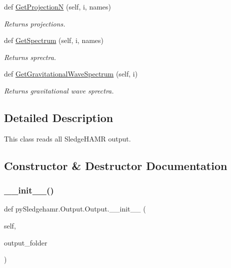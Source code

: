 \begin{DoxyCompactItemize}
def \mbox{\hyperlink{classpySledgehamr_1_1Output_1_1Output_a55e468a29e5b6fe519ff3689d560fd7e}{Get\+ProjectionN}} (self, i, names)
\begin{DoxyCompactList}\small\item\em Returns projections. \end{DoxyCompactList}\item 
def \mbox{\hyperlink{classpySledgehamr_1_1Output_1_1Output_a183b63d92df10667a7e9b64d7f0b1c6e}{Get\+Spectrum}} (self, i, names)
\begin{DoxyCompactList}\small\item\em Returns sprectra. \end{DoxyCompactList}\item 
def \mbox{\hyperlink{classpySledgehamr_1_1Output_1_1Output_ac7013643c1d17185805a245fac2cce23}{Get\+Gravitational\+Wave\+Spectrum}} (self, i)
\begin{DoxyCompactList}\small\item\em Returns gravitational wave sprectra. \end{DoxyCompactList}\end{DoxyCompactItemize}


\subsection{Detailed Description}
This class reads all Sledge\+H\+A\+MR output. 

\subsection{Constructor \& Destructor Documentation}
\mbox{\label{classpySledgehamr_1_1Output_1_1Output_a853e2158e6cedd7993bc2e4bbe695ca0}} 
\subsubsection{\texorpdfstring{\+\_\+\+\_\+init\+\_\+\+\_\+()}{\_\_init\_\_()}}
{\footnotesize\ttfamily def py\+Sledgehamr.\+Output.\+Output.\+\_\+\+\_\+init\+\_\+\+\_\+ (\begin{DoxyParamCaption}\item[{}]{self,  }\item[{}]{output\+\_\+folder }\end{DoxyParamCaption})}



